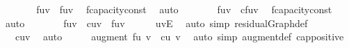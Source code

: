 {\ \ \isamarkupfalse%
\ \isamarkupfalse%
\ {\isachardoublequoteopen}{\isasymdots}\ {\isasymle}\ f{\isacharparenleft}u{\isacharcomma}v{\isacharparenright}\ {\isacharplus}\ f{\isacharprime}{\isacharparenleft}u{\isacharcomma}v{\isacharparenright}{\isachardoublequoteclose}\ \isamarkupfalse%
\ f{\isacharprime}{\isachardot}capacity{\isacharunderscore}const\ \isamarkupfalse%
\ auto\isanewline
\ \ \isamarkupfalse%
\ \isamarkupfalse%
\ {\isachardoublequoteopen}{\isasymdots}\ {\isasymle}\ f{\isacharparenleft}u{\isacharcomma}v{\isacharparenright}\ {\isacharplus}\ cf{\isacharparenleft}u{\isacharcomma}v{\isacharparenright}{\isachardoublequoteclose}\ \isamarkupfalse%
\ f{\isacharprime}{\isachardot}capacity{\isacharunderscore}const\ \isamarkupfalse%
\ auto\isanewline
\ \ \isamarkupfalse%
\ \isamarkupfalse%
\ {\isachardoublequoteopen}{\isasymdots}\ {\isacharequal}\ f{\isacharparenleft}u{\isacharcomma}v{\isacharparenright}\ {\isacharplus}\ c{\isacharparenleft}u{\isacharcomma}v{\isacharparenright}\ {\isacharminus}\ f{\isacharparenleft}u{\isacharcomma}v{\isacharparenright}{\isachardoublequoteclose}\isanewline
\ \ \ \ \isamarkupfalse%
\ {\isacartoucheopen}{\isacharparenleft}u{\isacharcomma}v{\isacharparenright}{\isasymin}E{\isacartoucheclose}\ \isamarkupfalse%
\ {\isacharparenleft}auto\ simp{\isacharcolon}\ residualGraph{\isacharunderscore}def{\isacharparenright}\isanewline
\ \ \isamarkupfalse%
\ \isamarkupfalse%
\ {\isachardoublequoteopen}{\isasymdots}\ {\isacharequal}\ c{\isacharparenleft}u{\isacharcomma}v{\isacharparenright}{\isachardoublequoteclose}\ \isamarkupfalse%
\ auto\isanewline
\ \ \isamarkupfalse%
\ \isamarkupfalse%
\ {\isachardoublequoteopen}augment\ f{\isacharprime}{\isacharparenleft}u{\isacharcomma}\ v{\isacharparenright}\ {\isasymle}\ c{\isacharparenleft}u{\isacharcomma}\ v{\isacharparenright}{\isachardoublequoteclose}\ \isacommand{{\isachardot}}\isamarkupfalse%
\isanewline
{}\isamarkupfalse%
\ {\isacharparenleft}auto\ simp{\isacharcolon}\ augment{\isacharunderscore}def\ cap{\isacharunderscore}positive{\isacharparenright}%
\endisatagproof
{\isafoldproof}%
%
\isadelimproof
%
\endisadelimproof
%
}%
